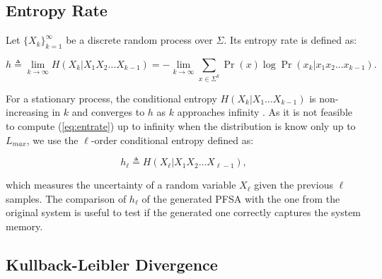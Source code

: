 {\subsection{Entropy Rate}

%

Let $\{X_k\}_{k=1}^{\infty}$ be a discrete random process over $\Sigma$. Its entropy rate is defined as:

\begin{equation}
h \triangleq \lim_{k\rightarrow\infty}H(X_k|X_1X_2\ldots X_{k-1}) = -\lim_{k\rightarrow\infty}\sum_{x\in \Sigma^k}\Pr(x)\log \Pr(x_k|x_1x_2\ldots x_{k-1}).  \label{eq:entrate}
\end{equation}

\noindent For a stationary process, the conditional entropy $H(X_k|X_1\ldots X_{k-1})$ is non-increasing in $k$ and converges to $h$ as $k$ approaches infinity \citep{cover2012elements}. As it is not feasible to compute (\ref{eq:entrate}) up to infinity when the distribution is know only up to $L_{max}$, we use the $\ell$-order conditional entropy defined as:

\begin{equation}
h_{\ell} \triangleq H(X_{\ell}|X_1X_2\ldots X_{\ell-1}),   \label{eq:entratel}
\end{equation}

\noindent which measures the uncertainty of a random variable $X_{\ell}$ given the previous $\ell$ samples.  The comparison of  $h_{\ell}$ of the generated PFSA with the one from the original system is useful to test if the generated one correctly captures the system memory.

\subsection{Kullback-Leibler Divergence}\label{sec:kld}

%

}
